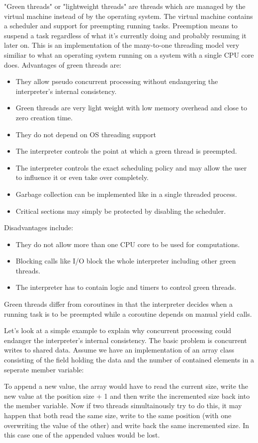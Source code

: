 \documentclass[bachelor,english]{hgbthesis}
\begin{document}
"Green threads" or "lightweight threads" are threads which are managed by the virtual machine instead of by the operating system. The virtual machine contains a scheduler and support for preempting running tasks.
Preemption means to suspend a task regardless of what it's currently doing and probably resuming it later on.
This is an implementation of the many-to-one threading model very similiar to what an operating system running on a system with a single CPU core does.
%
Advantages of green threads are:
%
\begin{itemize}
\item They allow pseudo concurrent processing without endangering the interpreter's internal consistency.
\item Green threads are very light weight with low memory overhead and close to zero creation time.
\item They do not depend on OS threading support
\item The interpreter controls the point at which a green thread is preempted.
\item The interpreter controls the exact scheduling policy and may allow the user to influence it or even take over completely.
\item Garbage collection can be implemented like in a single threaded process.
\item Critical sections may simply be protected by disabling the scheduler.
\end{itemize}
%
Disadvantages include:
%
\begin{itemize}
\item They do not allow more than one CPU core to be used for computations.
\item Blocking calls like I/O block the whole interpreter including other green threads.
\item The interpreter has to contain logic and timers to control green threads.
\end{itemize}

Green threads differ from coroutines in that the interpreter decides when a running task is to be preempted while a coroutine depends on manual yield calls.

Let's look at a simple example to explain why concurrent processing could endanger the interpreter's internal consistency. The basic problem is concurrent writes to shared data. Assume we have an implementation of an array class consisting of the field holding the data and the number of contained elements in a seperate member variable:
\begin{CCode}
pmclass ResizableIntegerArray auto_attrs provides array {
    ATTR INTVAL   size;      /* number of INTVALs stored in this array */
    ATTR INTVAL * int_array; /* INTVALs are stored here */
\end{CCode}
To append a new value, the array would have to read the current size, write the new value at the position size + 1 and then write the incremented size back into the member variable.
Now if two threads simultainously try to do this, it may happen that both read the same size, write to the same position (with one overwriting the value of the other) and write back the same incremented size. In this case one of the appended values would be lost.
\end{document}

